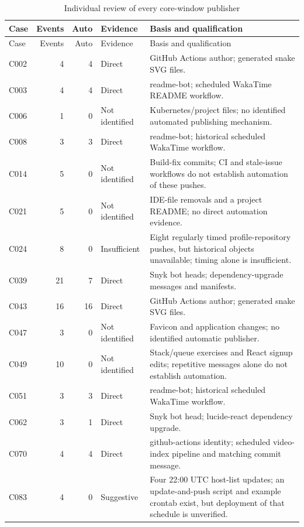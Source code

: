 {\footnotesize\setlength{\tabcolsep}{3pt}
\begin{longtable}{@{}p{}rrp{}p{}@{}}
\caption{Individual review of every core-window publisher}\label{tab:evidence_cases}\\
\toprule Case & Events & Auto & Evidence & Basis and qualification \\
\midrule\endfirsthead
\toprule Case & Events & Auto & Evidence & Basis and qualification \\
\midrule\endhead
\bottomrule\endfoot
C002 & 4 & 4 & Direct & GitHub Actions author; generated snake SVG files. \\
C003 & 4 & 4 & Direct & readme-bot; scheduled WakaTime README workflow. \\
C006 & 1 & 0 & Not identified & Kubernetes/project files; no identified automated publishing mechanism. \\
C008 & 3 & 3 & Direct & readme-bot; historical scheduled WakaTime workflow. \\
C014 & 5 & 0 & Not identified & Build-fix commits; CI and stale-issue workflows do not establish automation of these pushes. \\
C021 & 5 & 0 & Not identified & IDE-file removals and a project README; no direct automation evidence. \\
C024 & 8 & 0 & Insufficient & Eight regularly timed profile-repository pushes, but historical objects unavailable; timing alone is insufficient. \\
C039 & 21 & 7 & Direct & Snyk bot heads; dependency-upgrade messages and manifests. \\
C043 & 16 & 16 & Direct & GitHub Actions author; generated snake SVG files. \\
C047 & 3 & 0 & Not identified & Favicon and application changes; no identified automatic publisher. \\
C049 & 10 & 0 & Not identified & Stack/queue exercises and React signup edits; repetitive messages alone do not establish automation. \\
C051 & 3 & 3 & Direct & readme-bot; historical scheduled WakaTime workflow. \\
C062 & 3 & 1 & Direct & Snyk bot head; lucide-react dependency upgrade. \\
C070 & 4 & 4 & Direct & github-actions identity; scheduled video-index pipeline and matching commit message. \\
C083 & 4 & 0 & Suggestive & Four 22:00 UTC host-list updates; an update-and-push script and example crontab exist, but deployment of that schedule is unverified. \\

\end{longtable}}
